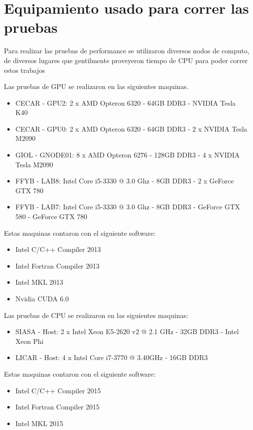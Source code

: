 \chapter{Equipamiento usado para correr las pruebas}

Para realizar las pruebas de performance se utilizaron diversos nodos de computo, de diversos lugares que
gentilmente proveyeron tiempo de CPU para poder correr estos trabajos

Las pruebas de GPU se realizaron en las siguientes maquinas.

\begin{itemize}
  \item CECAR - GPU2: 2 x AMD Opteron 6320 - 64GB DDR3 - NVIDIA Tesla K40
  \item CECAR - GPU0: 2 x AMD Opteron 6320 - 64GB DDR3 - 2 x NVIDIA Tesla M2090
  \item GIOL - GNODE01: 8 x AMD Opteron 6276 - 128GB DDR3 - 4 x NVIDIA Tesla M2090
  \item FFYB - LAB8: Intel Core i5-3330 @ 3.0 Ghz - 8GB DDR3 - 2 x GeForce GTX 780
  \item FFYB - LAB7: Intel Core i5-3330 @ 3.0 Ghz - 8GB DDR3 - GeForce GTX 580 - GeForce GTX 780
\end{itemize}

Estas maquinas contaron con el siguiente software:
\begin{itemize}
  \item Intel C/C++ Compiler 2013
  \item Intel Fortran Compiler 2013
  \item Intel MKL 2013
  \item Nvidia CUDA 6.0
\end{itemize}

Las pruebas de CPU se realizaron en las siguientes maquinas:
\begin{itemize}
  \item SIASA - Host: 2 x Intel Xeon E5-2620 v2 @ 2.1 GHz - 32GB DDR3 - Intel Xeon Phi
  \item LICAR - Host: 4 x Intel Core i7-3770 @ 3.40GHz - 16GB DDR3
\end{itemize}

Estas maquinas contaron con el siguiente software:
\begin{itemize}
  \item Intel C/C++ Compiler 2015
  \item Intel Fortran Compiler 2015
  \item Intel MKL 2015
\end{itemize}

